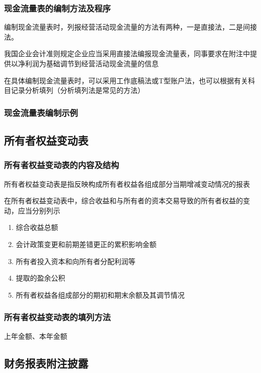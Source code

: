 \documentclass[UTF8,12pt]{ctexart}
\numberwithin{equation}{section} %
\numberwithin{figure}{section}
\numberwithin{table}{section}
\begin{document}
	\subsubsection{现金流量表的编制方法及程序}
	编制现金流量表时，列报经营活动现金流量的方法有两种，一是直接法，二是间接法。
	
	我国企业会计准则规定企业应当采用直接法编报现金流量表，同事要求在附注中提供以净利润为基础调节到经营活动现金流量的信息
	
	在具体编制现金流量表时，可以采用工作底稿法或T型账户法，也可以根据有关科目记录分析填列（分析填列法是常见的方法）
	
	\subsubsection{现金流量表编制示例}
	
	
	\subsection{所有者权益变动表}
	\subsubsection{所有者权益变动表的内容及结构}
	所有者权益变动表是指反映构成所有者权益各组成部分当期增减变动情况的报表
	
	在所有者权益变动表中，综合收益和与所有者的资本交易导致的所有者权益的变动，应当分别列示
	\begin{enumerate}
		\item 综合收益总额
		
		\item 会计政策变更和前期差错更正的累积影响金额
		
		\item 所有者投入资本和向所有者分配利润等
		
		\item 提取的盈余公积
		
		\item 所有者权益各组成部分的期初和期末余额及其调节情况
	\end{enumerate}
	\subsubsection{所有者权益变动表的填列方法}
	上年金额、本年金额
	
	\subsection{财务报表附注披露}
\end{document}
